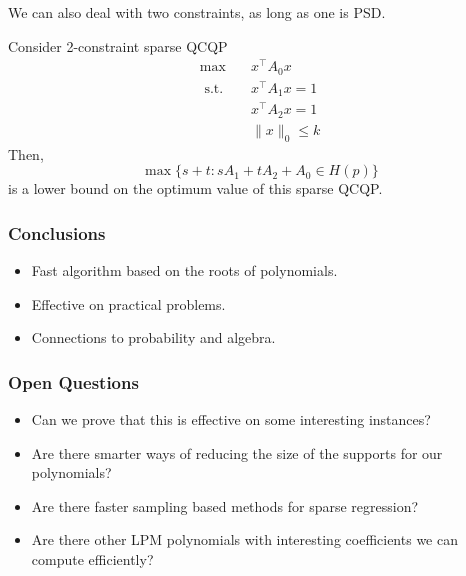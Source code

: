 \documentclass{beamer}
\newcommand{\st}{{\text{ s.t. }}}
\begin{document}
\begin{frame}
    We can also deal with two constraints, as long as one is PSD.

    Consider 2-constraint sparse QCQP 
    \begin{equation}
        \begin{aligned}
            \max\quad & x^{\intercal}A_0x\\
            \st & x^{\intercal}A_1x = 1\\
                & x^{\intercal}A_2x = 1\\
                & \|x\|_0 \le k
        \end{aligned}
    \end{equation}
    Then, 
    \[
        \max \{s+t : sA_1+tA_2+A_0 \in H(p)\}
    \]
    is a lower bound on the optimum value of this sparse QCQP.
\end{frame}

\begin{frame}
    \frametitle{Conclusions}
    \begin{itemize}
        \item Fast algorithm based on the roots of polynomials.
        \item Effective on practical problems.
        \item Connections to probability and algebra.
    \end{itemize}
\end{frame}
\begin{frame}
    \frametitle{Open Questions}
    \begin{itemize}
        \item Can we prove that this is effective on some interesting instances?
        \item Are there smarter ways of reducing the size of the supports for our polynomials?
        \item Are there faster sampling based methods for sparse regression?
        \item Are there other LPM polynomials with interesting coefficients we can compute efficiently?
    \end{itemize}
    
\end{frame}
\end{document}

